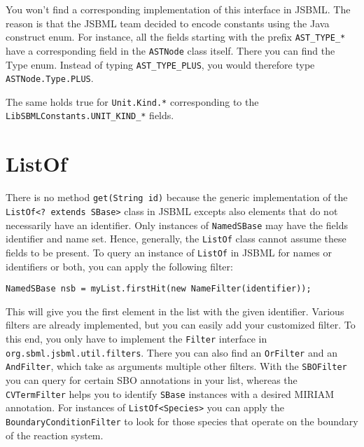 \documentclass[a4paper,11pt]{scrartcl}
\begin{document}
You won't find a corresponding implementation of this interface in 
JSBML. The reason is that the JSBML team decided to encode constants using the
Java construct enum. For instance, all the fields starting with the
prefix \verb!AST_TYPE_*! have a corresponding field in the \verb!ASTNode! class
itself. There you can find the Type enum. Instead of typing
\verb!AST_TYPE_PLUS!, you would therefore type \verb!ASTNode.Type.PLUS!.

The same holds true for \verb!Unit.Kind.*! corresponding to the 
\verb!LibSBMLConstants.UNIT_KIND_*! fields.

\section{ListOf}

There is no method \verb!get(String id)! because the generic implementation of 
the \verb!ListOf<? extends SBase>! class in JSBML excepts also elements that do 
not necessarily have an identifier. Only instances of \verb!NamedSBase! may have
the fields identifier and name set. Hence, generally, the \verb!ListOf! class 
cannot assume these fields to be present. To query an instance of \verb!ListOf! 
in JSBML for names or identifiers or both, you can apply the following 
filter:
\begin{verbatim}
NamedSBase nsb = myList.firstHit(new NameFilter(identifier));
\end{verbatim}
This will give you the first element in the list with the given identifier.
Various filters are already implemented, but you can easily add your 
customized filter. To this end, you only have to implement the \verb!Filter! 
interface in \verb!org.sbml.jsbml.util.filters!. There you can also find an
\verb!OrFilter! and an \verb!AndFilter!, which take as arguments multiple other
filters. With the \verb!SBOFilter! you can query for certain SBO annotations in
your list, whereas the \verb!CVTermFilter! helps you to identify \verb!SBase!
instances with a desired MIRIAM annotation. For instances of
\verb!ListOf<Species>! you can apply the \verb!BoundaryConditionFilter! to look
for those species that operate on the boundary of the reaction system.


% 
% 
\end{document}
